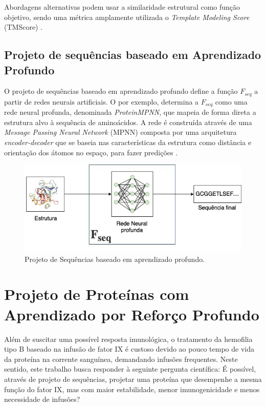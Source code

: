 Abordagens alternativas podem usar a similaridade estrutural como função objetivo,
sendo uma métrica amplamente utilizada o \textit{Template Modeling Score} (TMScore) \cite{tmscore}.

\subsection{Projeto de sequências baseado em Aprendizado Profundo}

O projeto de sequências baseado em aprendizado profundo define a função $F_{seq}$ 
a partir de redes neurais artificiais. 
O \cite{ProteinMPNN} por exemplo, 
determina a $F_{seq}$ como uma rede neural profunda, denominada \textit{ProteinMPNN}, 
que mapeia de forma direta a estrutura alvo à sequência de aminoácidos. 
A rede é construída através de uma \textit{Message Passing Neural Network} (MPNN) 
composta por uma arquitetura \textit{encoder-decoder} 
que se baseia nas características da estrutura como distância e orientação dos átomos no espaço, 
para fazer predições \cite{ProteinMPNN}. 

\begin{figure}[H]
  \centering
  \includegraphics[width=.8\textwidth]{figuras/metodologia-DeepLearningBased.jpg}
  \caption{Projeto de Sequências baseado em aprendizado profundo.}
\end{figure}

\section{Projeto de Proteínas com Aprendizado por Reforço Profundo} 
\label{section:Proposta}

Além de suscitar uma possível resposta imunológica, 
o tratamento da hemofilia tipo B baseado na infusão de fator IX
é custoso devido ao pouco tempo de vida da proteína na corrente sanguínea, demandando infusões frequentes. 
Neste sentido, este trabalho busca responder à seguinte pergunta científica: 
É possível, através de projeto de sequências, projetar uma proteína que desempenhe a mesma função do fator IX, 
mas com maior estabilidade, menor imunogenicidade e menos necessidade de infusões?

